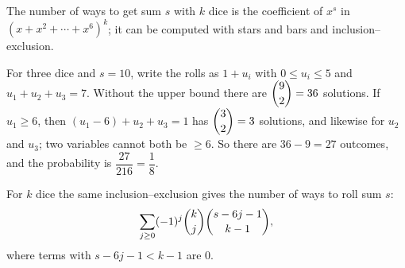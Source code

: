 The number of ways to get sum $s$ with $k$ dice is the coefficient of $x^s$ in $\left(x+x^2+\cdots+x^6\right)^k$; it can be computed with stars and bars and inclusion--exclusion.

For three dice and $s=10$, write the rolls as $1+u_i$ with $0\le u_i\le5$ and $u_1+u_2+u_3=7$. Without the upper bound there are $\dbinom92=36$ solutions. If $u_1\ge6$, then $(u_1-6)+u_2+u_3=1$ has $\dbinom32=3$ solutions, and likewise for $u_2$ and $u_3$; two variables cannot both be $\ge6$. So there are $36-9=27$ outcomes, and the probability is $\dfrac{27}{216}=\boxed{\dfrac{1}{8}}$.

For $k$ dice the same inclusion--exclusion gives the number of ways to roll sum $s$:
\[\sum_{j\ge0}(-1)^j\dbinom kj\dbinom{s-6j-1}{k-1},\]
where terms with $s-6j-1<k-1$ are $0$.
